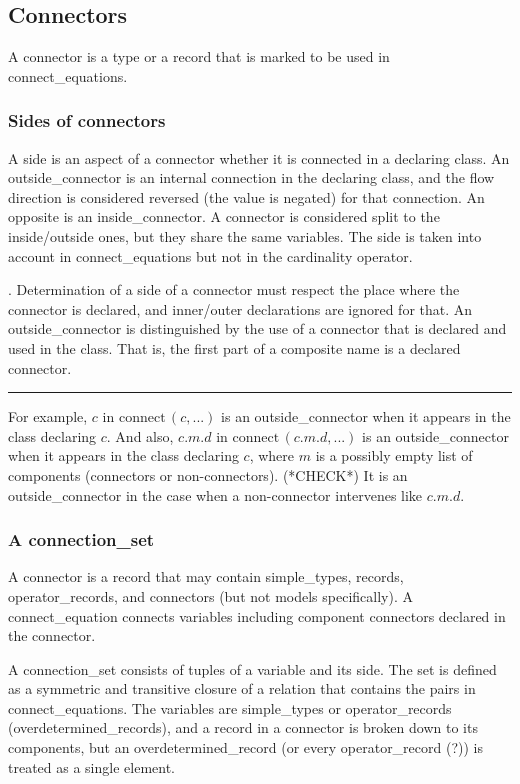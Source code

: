 \documentclass[10pt,b5paper]{article}
\newcounter{ruleno}
\def\tombstone{\rule[-.2ex]{.3em}{1.8ex}}
\newenvironment{widequote}{%
\list{}{\leftmargin=0mm\rightmargin=\leftmargin}%
\item\relax}{\endlist}
\def\factlead{\refstepcounter{ruleno}{\bf{}Fact~\arabic{ruleno}}.}
\newenvironment{QFACT}{\begin{widequote}\factlead}%
{\unskip\nobreakspace\tombstone\end{widequote}\ignorespacesafterend}
\begin{document}

\subsection{Connectors}

A connector is a type or a record that is marked to be used in
connect_equations.

\subsubsection*{Sides of connectors}

A side is an aspect of a connector whether it is connected in a
declaring class.  An outside_connector is an internal connection in
the declaring class, and the flow direction is considered reversed
(the value is negated) for that connection.  An opposite is an
inside_connector.  A connector is considered split to the
inside/outside ones, but they share the same variables.  The side is
taken into account in connect_equations but not in the {cardinality}
operator.

\begin{QFACT} Determination of a side of a connector must respect the
place where the connector is declared, and inner/outer declarations
are ignored for that.  An outside_connector is distinguished by the
use of a connector that is declared and used in the class.  That is,
the first part of a composite name is a declared connector.\end{QFACT}
For example, $c$ in $\mathrm{connect}\,(c,...)$ is an
outside_connector when it appears in the class declaring $c$.  And
also, $c.m.d$ in $\mathrm{connect}\,(c.m.d,...)$ is an
outside_connector when it appears in the class declaring $c$, where
$m$ is a possibly empty list of components (connectors or
non-connectors).  (*CHECK*) It is an outside_connector in the case
when a non-connector intervenes like $c.m.d$.

\subsubsection*{A connection_set}

A connector is a record that may contain simple_types, records,
operator_records, and connectors (but not models specifically).  A
connect_equation connects variables including component connectors
declared in the connector.

A connection_set consists of tuples of a variable and its side.  The
set is defined as a symmetric and transitive closure of a relation
that contains the pairs in connect_equations.  The variables are
simple_types or operator_records (overdetermined_records), and a
record in a connector is broken down to its components, but an
overdetermined_record (or every operator_record (?)) is treated as a
single element.
\end{document}

